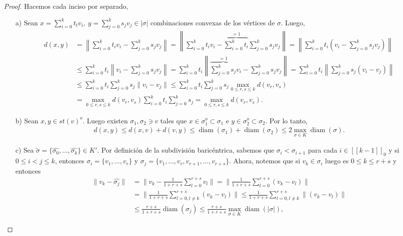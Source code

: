 \documentclass[11pt]{article}
\newcommand{\tint}[1]{#1^o}%
\newcommand{\nat}[1]{[\![#1]\!]}
\newcommand{\natzero}[1]{\nat{#1}_0}
\newcommand{\diam}[1]{\operatorname{diam}(#1)}
\begin{document}
\begin{proof} Hacemos cada inciso por separado,
\begin{itemize}
\item[a)] Sean $x = \sum_{i = 0}^k t_tv_i, \ y = \sum_{j = 0}^k s_jv_j \in |\sigma|$ combinaciones convexas de los v\'ertices de $\sigma$. Luego,
\begin{align*}
d(x,y) &= \left\|\sum_{i = 0}^k t_iv_i - \sum_{j = 0}^k s_jv_j\right\| = \left\|\sum_{i = 0}^k t_iv_i - \overbrace{\sum_{i = 0}^kt_i}^{=1}\sum_{j = 0}^k s_jv_j\right\| = \left\|\sum_{i = 0}^k t_i \left(v_i-\sum_{j = 0}^k s_jv_j\right)\right\| \\ & \leq \sum_{i = 0}^k t_i \left\|v_i-\sum_{j = 0}^k s_jv_j\right\| = \sum_{i = 0}^k t_i \left\|\overbrace{\sum_{j = 0}^k s_j}^{=1}v_i-\sum_{j = 0}^k s_jv_j\right\| = \sum_{i = 0}^k t_i \left\|\sum_{j = 0}^k s_j(v_i -v_j)\right\|\\
& \leq \sum_{i = 0}^k t_i \sum_{j = 0}^k s_j \|v_i -v_j\| \leq \sum_{i = 0}^k t_i \sum_{j = 0}^k s_j \max_{0 \leq r,s \leq k}d(v_r,v_s)\\
&  = \max_{0 \leq r,s \leq k}d(v_r,v_s) \sum_{i = 0}^k t_i \sum_{j = 0}^k s_j = \max_{0 \leq r,s \leq k}d(v_r,v_s).
\end{align*}
\item[b)] Sean $x,y \in \tint{st(v)}$. Luego existen $\sigma_1, \sigma_2 \ni v$ tales que $x \in \tint{\sigma_1} \subset \sigma_1$ e $y \in \tint{\sigma_2} \subset \sigma_2$. Por lo tanto,
\begin{align*}
d(x,y) \leq d(x,v) + d(v,y) \leq \diam{\sigma_1} + \diam{\sigma_2} \leq 2 \max_{\sigma \in K}\diam{\sigma}.
\end{align*}
\item[c)] Sea $\tilde{\sigma} = \{\widehat{\sigma_0}, \dots, \widehat{\sigma_k}\} \in K'$. Por definici\'on de la subdivisi\'on baric\'entrica, sabemos que $\sigma_i < \sigma_{i+1}$ para cada $i \in \natzero{k-1}$ y si $0 \leq i < j \leq k$, entonces $\sigma_i = \{v_1, \dots, v_r\}$ y $\sigma_j = \{v_1, \dots, v_r, v_{r+1}, \dots, v_{r+s}\}$. Ahora, notemos que si $v_k \in \sigma_i$ luego es $0 \leq k \leq r+s$ y entonces
\begin{align*}
\|v_k - \widehat{\sigma_j}\| & = \|v_k - \frac{1}{1+r+s}\sum_{l=0}^{r+s}v_l\| = \|\frac{1}{1+r+s}\sum_{l=0}^{r+s}(v_k-v_l)\|\\
& = \|\frac{1}{1+r+s}\sum_{l=0,l \neq k}^{r+s}(v_k-v_l)\| \leq \frac{1}{1+r+s}\sum_{l=0,l \neq k}^{r+s}\|(v_k-v_l)\|\\
& \leq \frac{r+s}{1+r+s}\diam{\sigma_j} \leq \frac{r+s}{1+r+s} \max_{\sigma \in K}\diam{|\sigma|},

\end{align*}
\end{itemize}
\end{proof}
\end{document}
